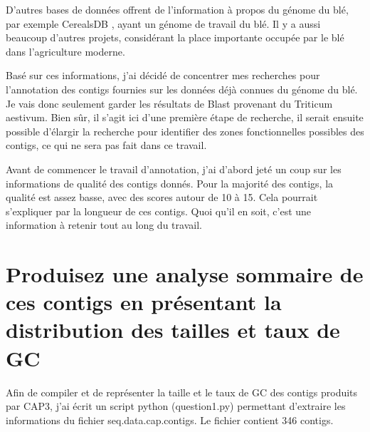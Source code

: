 \documentclass[10.9pt]{article} %
\begin{document}
D'autres bases de données offrent de l'information à propos du génome du blé, par exemple CerealsDB \cite{cerealsDB}, ayant un génome
de travail du blé. Il y a aussi beaucoup d'autres projets, considérant la place importante occupée par le blé dans l'agriculture moderne.

Basé sur ces informations, j'ai décidé de concentrer mes recherches pour l'annotation des contigs fournies sur les données déjà
connues du génome du blé. Je vais donc seulement garder les résultats de Blast provenant du Triticum aestivum. Bien sûr, il s'agit
ici d'une première étape de recherche, il serait ensuite possible d'élargir la recherche pour identifier des zones fonctionnelles possibles
des contigs, ce qui ne sera pas fait dans ce travail.

Avant de commencer le travail d'annotation, j'ai d'abord jeté un coup sur les informations de qualité des contigs donnés. Pour la majorité
des contigs, la qualité est assez basse, avec des scores autour de 10 à 15. Cela pourrait s'expliquer par la longueur de ces contigs.
Quoi qu'il en soit, c'est une information à retenir tout au long du travail.


\newpage
\section{Produisez une analyse sommaire de ces contigs en présentant la distribution des tailles et taux de GC} %

Afin de compiler et de représenter la taille et le taux de GC des contigs produits par
CAP3, j'ai écrit un script python (question1.py) permettant d'extraire les informations du
fichier seq.data.cap.contigs. Le fichier contient 346 contigs.
\end{document}
